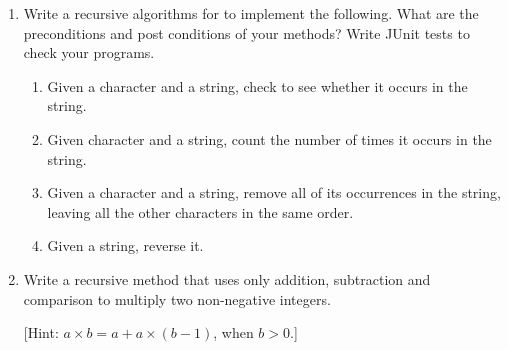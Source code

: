 \documentclass[twoside=false,DIV=14]{scrartcl}
\begin{document}
\begin{enumerate}
\item Write a recursive algorithms for to implement the following. What are the preconditions and post conditions of your methods? Write  JUnit tests to check your programs.
\begin{enumerate}
\item Given a character and a string, check to see whether it occurs in the string.
\item Given character and a string, count the number of times it occurs in the string.
\item Given a character and a string, remove all  of its occurrences in the string, leaving all the other characters in the same order.
\item Given a string, reverse it.
\end{enumerate}

\item Write a recursive method that uses only addition, subtraction and comparison to multiply two non-negative integers.

[Hint: $a{\times} b = a + a{\times} (b-1)$, when $b>0$.] 


 
\end{enumerate}
\end{document}
